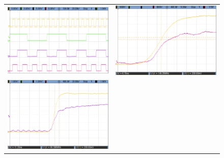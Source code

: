\begin{figure}[H]
    \centering
        \begin{tabular}{c c}
            \includegraphics[scale=0.2]{../EJ7/Mediciones/Osciloscopio/Segundo_Intento/Sincronico/cropped_contador.png} &
            \includegraphics[scale=0.2]{../EJ7/Mediciones/Osciloscopio/Segundo_Intento/Sincronico/cropped_salida_q0.png} \\
            \includegraphics[scale=0.2]{../EJ7/Mediciones/Osciloscopio/Segundo_Intento/Sincronico/cropped_salida_q1.png} &

\end{tabular}
\end{figure}
